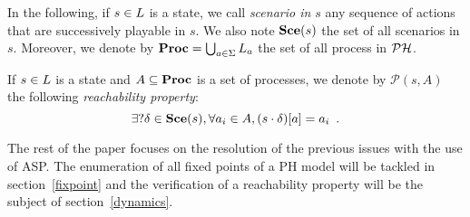 In the following, if $s \in L$ is a state,
we call \emph{scenario in $s$}
any sequence of actions that are successively playable in $s$.
We also note $\mathbf{Sce}(s)$ the set of all scenarios in $s$.
Moreover, we denote by $\mathbf{Proc} = \bigcup_{a \in \Sigma} L_a$
the set of all process in $\mathcal{PH}$.

\begin{definition}
\label{def:reachability}
  If $s \in L$ is a state and $A \subseteq \mathbf{Proc}$ is a set of processes,
  we denote by $\mathcal{P}(s, A)$ the following \emph{reachability property}:
  \[\exists? \delta \in \mathbf{Sce}(s), \forall a_i \in A, {(s \cdot \delta)[a]} = a_i
    \enspace.\]
\end{definition}

The rest of the paper focuses on the resolution of the previous issues
with the use of ASP.
The enumeration of all fixed points of a PH model will be tackled in
section~\ref{fixpoint}
and the verification of a reachability property will be the subject of
section~\ref{dynamics}.
